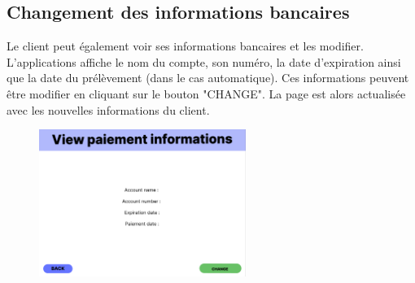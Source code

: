 \subsection{Changement des informations bancaires}
\begin{flushleft}
Le client peut également voir ses informations bancaires et les modifier. L'applications affiche le nom du compte, son numéro, la date d'expiration ainsi que la date du prélèvement (dans le cas automatique). Ces informations peuvent être modifier en cliquant sur le bouton "CHANGE". La page est alors actualisée avec les nouvelles informations du client.
\end{flushleft}
\begin{figure}[h]
\centering
\includegraphics[width = 0.6\textwidth]{extension-maxime/interface/img/paiement-informations.png}
\end{figure}
